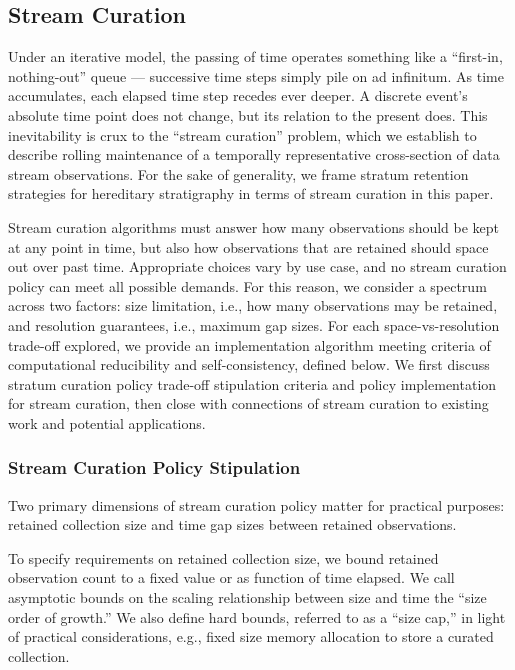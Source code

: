 \subsection{Stream Curation} \label{sec:streaming-curation}

Under an iterative model, the passing of time operates something like a ``first-in, nothing-out'' queue --- successive time steps simply pile on ad infinitum.
As time accumulates, each elapsed time step recedes ever deeper.
A discrete event's absolute time point does not change, but its relation to the present does.  %
This inevitability is crux to the ``stream curation'' problem, which we establish to describe rolling maintenance of a temporally representative cross-section of data stream observations.
For the sake of generality, we frame stratum retention strategies for hereditary stratigraphy in terms of stream curation in this paper.

Stream curation algorithms must answer how many observations should be kept at any point in time, but also how observations that are retained should space out over past time.
Appropriate choices vary by use case, and no stream curation policy can meet all possible demands.
For this reason, we consider a spectrum across two factors: size limitation, i.e., how many observations may be retained, and resolution guarantees, i.e., maximum gap sizes.
For each space-vs-resolution trade-off explored, we provide an implementation algorithm meeting criteria of computational reducibility and self-consistency, defined below.
We first discuss stratum curation policy trade-off stipulation criteria and policy implementation for stream curation, then close with connections of stream curation to existing work and potential applications.

\subsubsection{Stream Curation Policy Stipulation}

Two primary dimensions of stream curation policy matter for practical purposes: retained collection size and time gap sizes between retained observations.

To specify requirements on retained collection size, we bound retained observation count to a fixed value or as function of time elapsed.
We call asymptotic bounds on the scaling relationship between size and time  the ``size order of growth.''
We also define hard bounds, referred to as a ``size cap,'' in light of practical considerations, e.g., fixed size memory allocation to store a curated collection.


